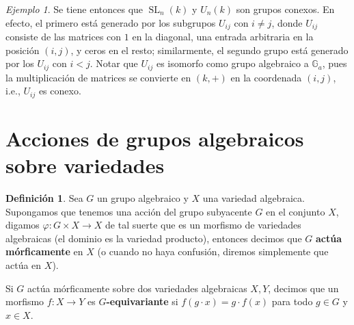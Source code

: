 \documentclass[spanish,12pt]{amsart}
\theoremstyle{definition}
\newtheorem{definition}[theorem]{Definición}
\theoremstyle{remark}
\newtheorem{example}[theorem]{Ejemplo}
\numberwithin{equation}{section}
\begin{document}
\begin{example}\label{ejemplo:SL y U son conexos}
Se tiene entonces que $\operatorname{SL}_n (k)$ y $U_n (k)$ son grupos conexos. En efecto, el primero está generado por los subgrupos $U_{ij}$ con $i \neq j$, donde $U_{ij}$ consiste de las matrices con $1$ en la diagonal, una entrada arbitraria en la posición $(i, j)$, y ceros en el resto; similarmente, el segundo grupo está generado por los $U_{ij}$ con $i < j$. Notar que $U_{ij}$ es isomorfo como grupo algebraico a $\mathbb{G}_a$, pues la multiplicación de matrices se convierte en $(k, +)$ en la coordenada $(i,j)$, i.e., $U_{ij}$ es conexo.
\end{example}


\section{Acciones de grupos algebraicos sobre variedades}

\begin{definition}
Sea $G$ un grupo algebraico y $X$ una variedad algebraica. Supongamos que tenemos una acción del grupo subyacente $G$ en el conjunto $X$, digamos $\varphi : G \times X \to X$ de tal suerte que es un morfismo de variedades algebraicas (el dominio es la variedad producto), entonces decimos que $G$ \textbf{actúa mórficamente} en $X$ (o cuando no haya confusión, diremos simplemente que actúa en $X$).

Si $G$ actúa mórficamente sobre dos variedades algebraicas $X,Y$, decimos que un morfismo $f : X \to Y$ es \textbf{$G$-equivariante} si $f(g \cdot x) = g \cdot f(x)$ para todo $g \in G$ y $x \in X$.
\end{definition}
\end{document}
